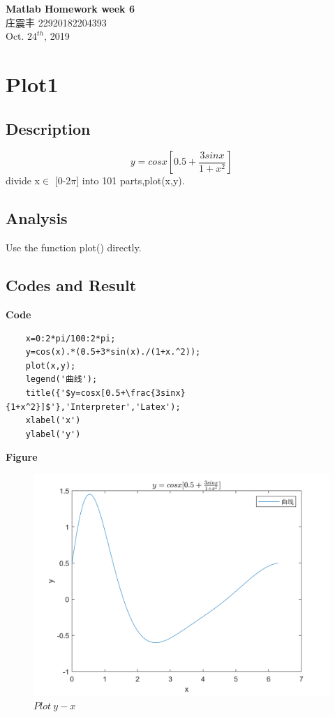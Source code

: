 \documentclass[UTF8,a4paper]{article}
\begin{document}
\begin{center}
    \textbf{\LARGE{Matlab Homework week 6}}\\[0.5cm]
    \normalsize{庄震丰 22920182204393}\\[0.5cm]
    \large{Oct. $24^{th}$, 2019}
\end{center}
\section{Plot1}
\subsection{Description}
$$
    y=cosx[0.5+\frac{3sinx}{1+x^2}]
$$
divide x$\in$ [0-2$\pi$] into 101 parts,plot(x,y).
\subsection{Analysis}
Use the function plot() directly.
\subsection{Codes and Result}
\textbf{Code}
\begin{lstlisting}
    x=0:2*pi/100:2*pi;
    y=cos(x).*(0.5+3*sin(x)./(1+x.^2));
    plot(x,y);
    legend('曲线');
    title({'$y=cosx[0.5+\frac{3sinx}{1+x^2}]$'},'Interpreter','Latex');
    xlabel('x')
    ylabel('y')
\end{lstlisting}
\newpage
\textbf{Figure}
\begin{figure}[h]
    \centering
    \includegraphics[width=1\textwidth]{T4-1.png}
    \caption{$Plot~y-x$}
    \label{1}
\end{figure}
\end{document}
